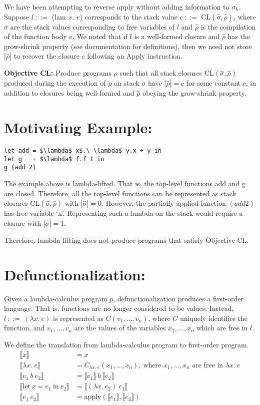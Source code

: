 \documentclass[11pt]{article}
\newcommand*{\br}[1]{\llbracket{#1}\rrbracket}
\begin{document}
We have been attempting to reverse apply without adding information to $\sigma_h$. Suppose $l\ ::=$ (lam $x$. $e$) corresponds to the stack value $c\ ::=$ $\text{CL}(\hat{\sigma}, \hat{\rho})$, where $\hat{\sigma}$ are the stack values corresponding to free variables of $l$ and $\hat{\rho}$ is the compilation of the function body $e$. We noted that if $l$ is a well-formed closure and $\hat{\rho}$ has the grow-shrink property (see documentation for definitions), then we need not store $|\hat{\rho}|$
to recover the closure $c$ following an Apply instruction.

\textbf{Objective CL:} Produce programs $\rho$ such that all stack closures CL$(\hat{\sigma}, \hat{\rho})$ produced during the execution of $\rho$ on stack $\sigma$ have $|\hat{\rho}| = c$ for some constant $c$, in addition to closures being well-formed and $\hat{\rho}$ obeying the grow-shrink property.

\section*{Motivating Example:}
\begin{lstlisting}[mathescape = true]
let add = $\lambda$ x$.\ \lambda$ y.x + y in
let g   = $\lambda$ f.f 1 in
g (add 2)
\end{lstlisting}

The example above is lambda-lifted. That is, the top-level functions add and g are closed. Therefore, all the top-level functions can be represented as stack closures CL$(\hat{\sigma}, \hat{\rho})$ with $|\hat{\sigma}| = 0$. However, the partially applied function $(add 2)$ has free variable `x'. Representing such a lambda on the stack would require a closure with $|\hat{\sigma}| = 1$. 

Therefore, lambda lifting does not produce programs that satisfy Objective CL\@.

\section*{Defunctionalization:}

Given a lambda-calculus program $p$, defunctionalization produces a first-order language. That is, functions are no longer considered to be values. Instead, $l\ ::=\ (\lambda x.\ e)$ is represented as $C(v_1, \dots, v_n)$, where $C$ uniquely identifies the function, and $v_1, \dots, v_n$ are the values of the variables $x_1, \dots, x_n$ which are free in $l$.

We define the translation from lambda-calculus program to first-order program.
\begin{align*}
    \br{x} &= x\\
    \br{\lambda x.\ e} &= C_{\lambda x.\ e} (x_1, \dots, x_n),\ \text{where $x_1, \dots, x_n$ are free in $\lambda x.\ e$}\\
    \br{e_1\ b\ e_2} &= \br{e_1}\ b\ \br{e_2}\\
    \br{\text{let}\ x = e_1\ \text{in}\ e_2} &= \br{(\lambda x.\ e_2)\ e_1}\\
    \br{e_1\ e_2} &= \text{apply}(\br{e_1}, \br{e_2})
\end{align*}
\end{document}
